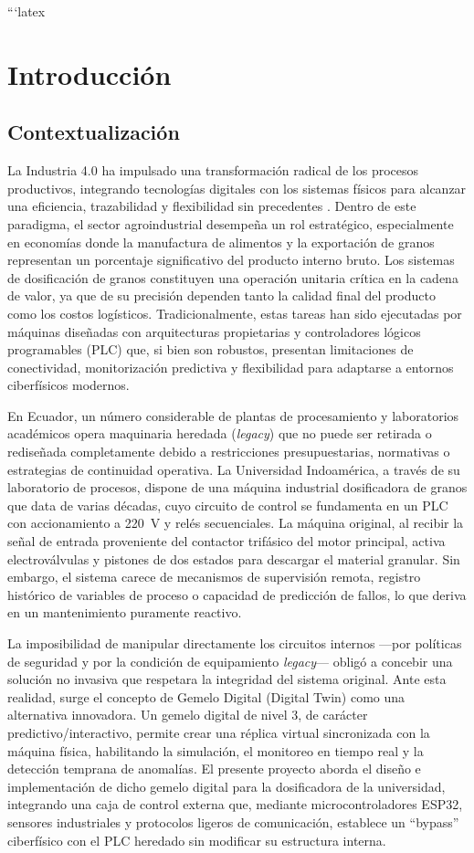 ```latex
\chapter{Introducción}
\label{chap:introduccion}

\section{Contextualización}
La Industria 4.0 ha impulsado una transformación radical de los procesos productivos, integrando tecnologías digitales con los sistemas físicos para alcanzar una eficiencia, trazabilidad y flexibilidad sin precedentes \cite{tao2019digital}. Dentro de este paradigma, el sector agroindustrial desempeña un rol estratégico, especialmente en economías donde la manufactura de alimentos y la exportación de granos representan un porcentaje significativo del producto interno bruto. Los sistemas de dosificación de granos constituyen una operación unitaria crítica en la cadena de valor, ya que de su precisión dependen tanto la calidad final del producto como los costos logísticos. Tradicionalmente, estas tareas han sido ejecutadas por máquinas diseñadas con arquitecturas propietarias y controladores lógicos programables (PLC) que, si bien son robustos, presentan limitaciones de conectividad, monitorización predictiva y flexibilidad para adaptarse a entornos ciberfísicos modernos.

En Ecuador, un número considerable de plantas de procesamiento y laboratorios académicos opera maquinaria heredada (\textit{legacy}) que no puede ser retirada o rediseñada completamente debido a restricciones presupuestarias, normativas o estrategias de continuidad operativa. La Universidad Indoamérica, a través de su laboratorio de procesos, dispone de una máquina industrial dosificadora de granos que data de varias décadas, cuyo circuito de control se fundamenta en un PLC con accionamiento a 220~V y relés secuenciales. La máquina original, al recibir la señal de entrada proveniente del contactor trifásico del motor principal, activa electroválvulas y pistones de dos estados para descargar el material granular. Sin embargo, el sistema carece de mecanismos de supervisión remota, registro histórico de variables de proceso o capacidad de predicción de fallos, lo que deriva en un mantenimiento puramente reactivo.

La imposibilidad de manipular directamente los circuitos internos —por políticas de seguridad y por la condición de equipamiento \textit{legacy}— obligó a concebir una solución no invasiva que respetara la integridad del sistema original. Ante esta realidad, surge el concepto de Gemelo Digital (Digital Twin) como una alternativa innovadora. Un gemelo digital de nivel 3, de carácter predictivo/interactivo, permite crear una réplica virtual sincronizada con la máquina física, habilitando la simulación, el monitoreo en tiempo real y la detección temprana de anomalías. El presente proyecto aborda el diseño e implementación de dicho gemelo digital para la dosificadora de la universidad, integrando una caja de control externa que, mediante microcontroladores ESP32, sensores industriales y protocolos ligeros de comunicación, establece un “bypass” ciberfísico con el PLC heredado sin modificar su estructura interna.

